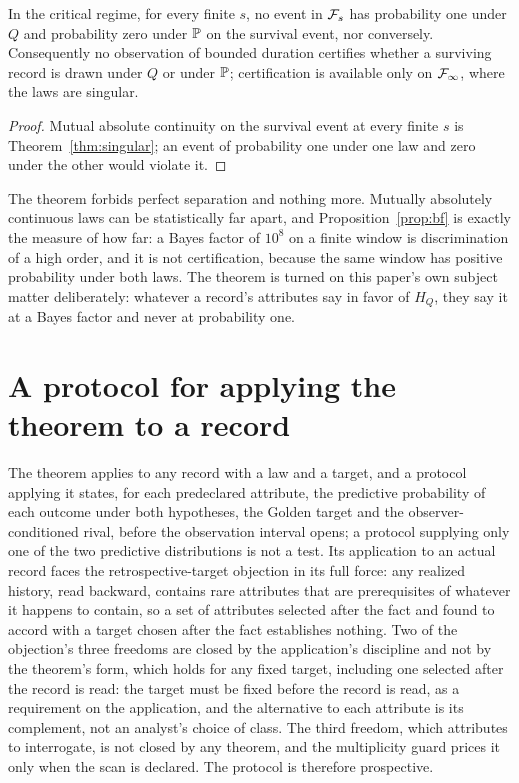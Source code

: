 \begin{theorem}\label{thm:ceiling}
In the critical regime, for every finite $s$, no event in $\mathcal{F}_s$ has
probability one under $Q$ and probability zero under $\mathbb{P}$ on the
survival event, nor conversely. Consequently no observation of bounded
duration certifies whether a surviving record is drawn under $Q$ or under
$\mathbb{P}$; certification is available only on $\mathcal{F}_\infty$, where the laws are
singular.
\end{theorem}

\begin{proof}
Mutual absolute continuity on the survival event at every finite $s$ is
Theorem~\ref{thm:singular}; an event of probability one under one law and
zero under the other would violate it.
\end{proof}

\begin{remark}\label{rem:certify}
The theorem forbids perfect separation and nothing more. Mutually
absolutely continuous laws can be statistically far apart, and
Proposition~\ref{prop:bf} is exactly the measure of how far: a Bayes
factor of $10^{8}$ on a finite window is discrimination of a high order,
and it is not certification, because the same window has positive
probability under both laws. The theorem is turned on this paper's own
subject matter deliberately: whatever a record's attributes say in favor
of $H_Q$, they say it at a Bayes factor and never at probability one.
\end{remark}

\section{A protocol for applying the theorem to a record} \label{sec:protocol} The theorem applies to any record with a law and a target, and a protocol applying it states, for each predeclared attribute, the predictive probability of each outcome under both hypotheses, the Golden target and the observer-conditioned rival, before the observation interval opens; a protocol supplying only one of the two predictive distributions is not a test. Its
application to an actual record faces the retrospective-target objection
in its full force: any realized history, read backward, contains rare
attributes that are prerequisites of whatever it happens to contain, so a
set of attributes selected after the fact and found to accord with a
target chosen after the fact establishes nothing. Two of the objection's three freedoms are closed by the application's discipline and not by the theorem's form, which holds for any fixed target, including one selected after the record is read: the target must be fixed before the record is read, as a requirement on the application, and the alternative to each attribute is its
complement, not an analyst's choice of class. The third freedom, which
attributes to interrogate, is not closed by any theorem, and the
multiplicity guard prices it only when the scan is declared. The protocol
is therefore prospective.

